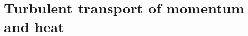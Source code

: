 \documentclass{article}
\begin{document}
\title{}
\author{}
\date{}
\fi

\section{Turbulent transport of momentum and heat}


















\ifx\allfiles\undefined         %
\end{document}
